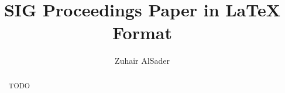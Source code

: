 \documentclass[sigconf]{acmart}
\begin{document}
\title{SIG Proceedings Paper in LaTeX Format}

\author{Zuhair AlSader}

\begin{abstract}
TODO
\end{abstract}



\maketitle





\end{document}
